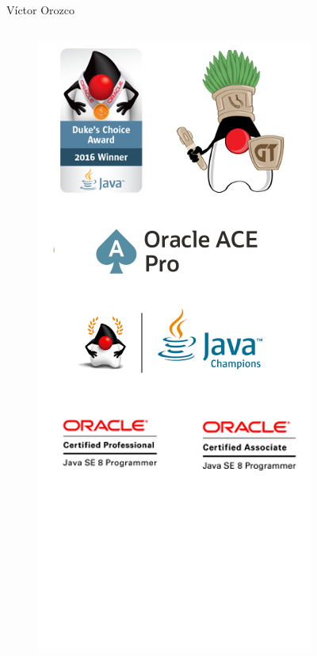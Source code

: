 \documentclass[aspectratio=169]{beamer}
\begin{document}
\begin{frame}{Víctor Orozco}
    \begin{columns}[T] %

        \begin{column}[T]{4cm} %
            \begin{figure}
                \centering
                \includegraphics[width=\linewidth]{Images/logos}

\end{figure}
\end{column}
\end{columns}
\end{frame}
\end{document}
